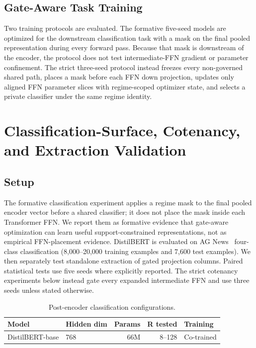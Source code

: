 \documentclass[11pt,a4paper]{article}
\begin{document}
\subsection{Gate-Aware Task Training}

Two training protocols are evaluated.  The formative five-seed models
are optimized for the downstream classification task with a mask on
the final pooled representation during every forward pass.  Because
that mask is downstream of the encoder, the protocol does not test
intermediate-FFN gradient or parameter confinement.  The strict
three-seed protocol instead freezes every non-governed shared path,
places a mask before each FFN down projection, updates only aligned
FFN parameter slices with regime-scoped optimizer state, and selects
a private classifier under the same regime identity.

\section{Classification-Surface, Cotenancy, and Extraction Validation}
\label{sec:empirical}

\subsection{Setup}

The formative classification experiment applies a regime mask to the final
pooled encoder vector before a shared classifier; it does not place
the mask inside each Transformer FFN.  We report them as formative
evidence that gate-aware optimization can learn useful
support-constrained representations, not as empirical FFN-placement
evidence.  DistilBERT is evaluated on AG
News~\citep{zhang2015agnews} four-class classification
(8,000--20,000 training examples and 7,600 test examples).  We then
separately test standalone extraction of gated projection columns.
Paired statistical tests use five seeds where explicitly reported.
The strict cotenancy experiments below instead gate every expanded
intermediate FFN and use three seeds unless stated otherwise.

\begin{table}[ht]
\centering
\caption{Post-encoder classification configurations.}
\label{tab:models}
\begin{tabular}{@{}llrrl@{}}
\toprule
\textbf{Model} & \textbf{Hidden dim} & \textbf{Params} &
\textbf{R tested} & \textbf{Training} \\
\midrule
DistilBERT-base & 768 & 66M & 8--128 & Co-trained \\
\bottomrule
\end{tabular}
\end{table}
\end{document}
